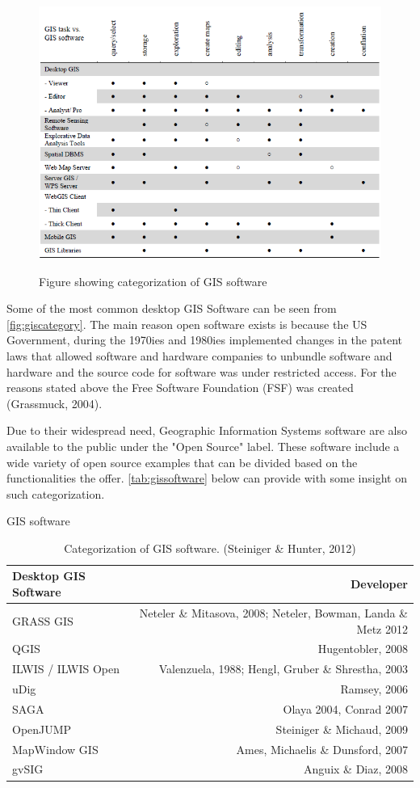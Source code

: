 \begin{figure}[h]
\centering
	{\includegraphics[width=\linewidth]{gfx/OS.png}}
\caption{Figure showing categorization of GIS software}
\label{fig:giscategory}
\end{figure}

Some of the most common desktop GIS Software can be seen from \autoref{fig:giscategory}.
The main reason open software exists is because the US Government, during the 1970ies and 1980ies implemented changes in the patent laws that allowed software and hardware companies to unbundle software and hardware and the source code for software was under restricted access. For the reasons stated above the Free Software Foundation (FSF) was created (Grassmuck, 2004).


Due to their widespread need, Geographic Information Systems software are also available to the public under the "Open Source" label. These software include a wide variety of open source examples that can be divided based on the functionalities the offer. \autoref{tab:gissoftware} below can provide with some insight on such categorization.  


\begin{table}[h]
\caption{GIS software}
\begin{tabular}{l | r}
Desktop GIS Software & Developer \\ 
\hline
GRASS GIS & Neteler \& Mitasova, 2008; Neteler, Bowman, Landa \& Metz 2012 \\ 
\hline
QGIS & Hugentobler, 2008 \\ 
\hline
ILWIS / ILWIS Open & Valenzuela, 1988; Hengl, Gruber \& Shrestha, 2003 \\ 
\hline
uDig & Ramsey, 2006 \\ 
\hline
SAGA & Olaya 2004, Conrad 2007  \\ 
\hline
OpenJUMP & Steiniger \& Michaud, 2009 \\ 
\hline
MapWindow GIS & Ames, Michaelis \& Dunsford, 2007 \\ 
\hline
gvSIG & Anguix \& Diaz, 2008 \\ 
\hline
\end{tabular}
\caption*{Categorization of GIS software. (Steiniger \& Hunter, 2012)}
\label{tab:gissoftware}
\end{table}